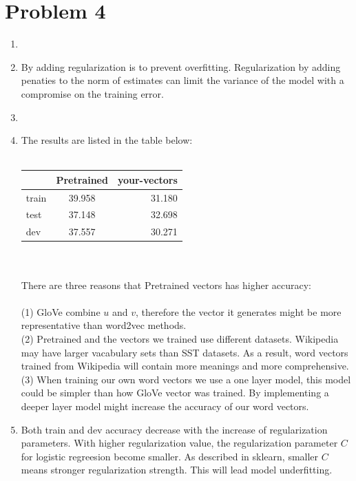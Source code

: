 \documentclass[10pt]{article}
\begin{document}
\section*{Problem 4}
\begin{enumerate}[label=(\alph*)]
\item
\item
By adding regularization is to prevent overfitting.
Regularization by adding penaties to the norm of estimates can limit the variance of the model with a compromise on the training error.

\item


\item
The results are listed in the table below:\\
\\
\begin{tabular}{ l | c | r }
\centering
        & Pretrained & your-vectors \\ \hline
  train & 39.958 & 31.180 \\ \hline
  test  & 37.148 & 32.698 \\ \hline
  dev   & 37.557 & 30.271 \\ \hline
\end{tabular}
\\
\\
There are three reasons that Pretrained vectors has higher accuracy:\\
\\
(1) GloVe combine $u$ and $v$,
therefore the vector it generates might be more representative than word2vec methods.\\
(2) Pretrained and the vectors we trained use different datasets.
Wikipedia may have larger vacabulary sets than SST datasets.
As a result, word vectors trained from Wikipedia will contain more meanings and more comprehensive.\\
(3) When training our own word vectors we use a one layer model,
this model could be simpler than how GloVe vector was trained.
By implementing a deeper layer model might increase the accuracy of our word vectors.


\item
Both train and dev accuracy decrease with the increase of regularization parameters.
With higher regularization value, the regularization parameter $C$ for logistic regreesion become smaller.
As described in sklearn, smaller $C$ means stronger regularization strength. This will lead model underfitting.


\end{enumerate}
\end{document}
